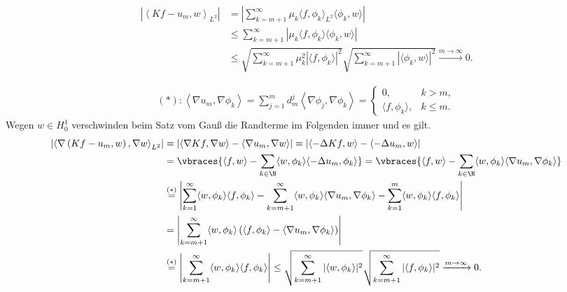 \begin{solution}
  \begin{align*} %
      \left| \left\langle Kf - u_m, w \right\rangle_{L^2} \right|
      &= \left| \sum_{k = m+1}^\infty \mu_k \langle f, \phi_k\rangle_{L^2} \langle \phi_k, w \rangle \right|\\
      &\leq \sum_{k = m+1}^\infty \left| \mu_k \langle f, \phi_k \rangle \langle \phi_k, w \rangle \right|\\
      &\leq \sqrt{ \sum_{k = m+1}^\infty \mu_k^2 |\langle f, \phi_k \rangle|^2} \sqrt{ \sum_{k = m+1}^\infty  |\langle \phi_k, w \rangle|^2} \xrightarrow{m \rightarrow \infty} 0.
  \end{align*}

  \begin{align*}
      (*): \left\langle \nabla u_m, \nabla \phi_k \right\rangle = \sum_{j = 1}^m d_m^j \left\langle \nabla \phi_j, \nabla \phi_k\right\rangle = \begin{cases}
          0, & k > m, \\
          \langle f, \phi_k \rangle, & k \leq m.
      \end{cases}
  \end{align*}
  Wegen $w \in H_0^1$ verschwinden beim Satz vom Gauß die Randterme im Folgenden immer und es gilt.
	\begin{align*}
	  \left| \left\langle \nabla\left(Kf - u_m, w\right), \nabla w \right\rangle_{L^2} \right| &= \left| \left\langle \nabla Kf, \nabla w \right\rangle - \langle \nabla u_m, \nabla w \rangle \right| = \left| \left\langle -\Delta Kf, w \right\rangle - \langle - \Delta u_m,  w \rangle \right| \\
	  &= \vbraces{\left\langle f, w \right\rangle - \sum_{k \in \N} \langle w, \phi_k \rangle \langle -\Delta u_m, \phi_k \rangle} = \vbraces{\left\langle f, w \right\rangle - \sum_{k \in \N} \langle w, \phi_k \rangle \langle \nabla u_m, \nabla \phi_k \rangle} \\
	  &\stackrel{(\ast)}{=} \left| \sum_{k = 1}^\infty \langle w, \phi_k \rangle \langle f, \phi_k \rangle - \sum_{k = m+1}^\infty \langle w, \phi_k \rangle \langle \nabla u_m, \nabla \phi_k\rangle - \sum_{k = 1}^m \langle w, \phi_k \rangle \langle f, \phi_k \rangle \right|\\
	  &= \left| \sum_{k = m+1}^\infty \langle w, \phi_k \rangle \left(\langle f, \phi_k \rangle - \langle \nabla u_m, \nabla \phi_k \rangle \right)\right|\\
	  &\stackrel{(\ast)}{=} \left| \sum_{k = m+1}^\infty \langle w, \phi_k \rangle \langle f, \phi_k \rangle \right|
	  \leq \sqrt{ \sum_{k = m+1}^\infty |\langle w, \phi_k \rangle|^2} \sqrt{ \sum_{k = m+1}^\infty |\langle f, \phi_k \rangle|^2} \xrightarrow{m \rightarrow \infty} 0.
	\end{align*}
\end{solution}

